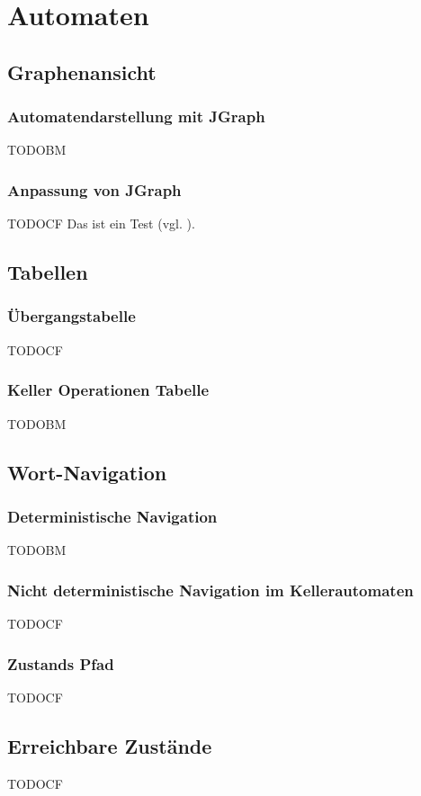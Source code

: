 

\chapter{Automaten}\label{Machines}


\section{Graphenansicht}


\subsection{Automatendarstellung mit JGraph}

TODOBM


\subsection{Anpassung von JGraph}

TODOCF Das ist ein Test (vgl. \cite{Sieber0}).


\section{Tabellen}


\subsection{Übergangstabelle}

TODOCF


\subsection{Keller Operationen Tabelle}

TODOBM


\section{Wort-Navigation}


\subsection{Deterministische Navigation}

TODOBM


\subsection{Nicht deterministische Navigation im Kellerautomaten}

TODOCF


\subsection{Zustands Pfad}

TODOCF


\section{Erreichbare Zustände}

TODOCF
